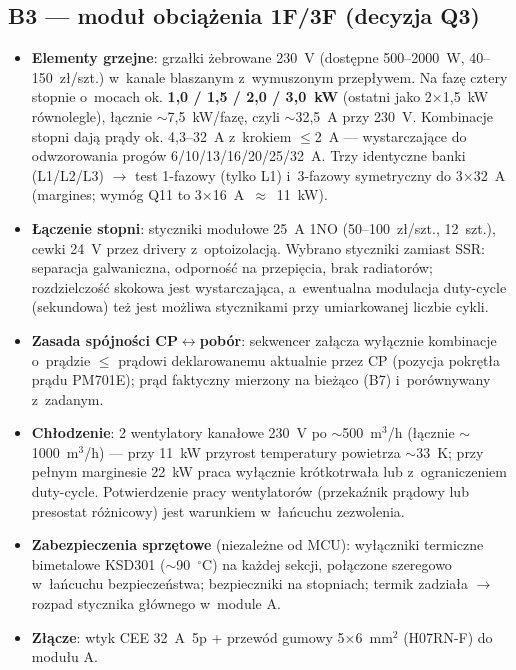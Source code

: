 \documentclass[11pt,a4paper]{article}
\begin{document}
\subsection{B3 --- moduł obciążenia 1F/3F (decyzja Q3)}
\label{sec:b3}

\begin{itemize}
\item \textbf{Elementy grzejne}: grzałki żebrowane 230~V (dostępne 500--2000~W, 40--150~zł/szt.) w~kanale blaszanym z~wymuszonym przepływem. Na fazę cztery stopnie o~mocach ok. \textbf{1,0 / 1,5 / 2,0 / 3,0~kW} (ostatni jako 2$\times$1,5~kW równolegle), łącznie $\sim$7,5~kW/fazę, czyli $\sim$32,5~A przy 230~V. Kombinacje stopni dają prądy ok. 4,3--32~A z~krokiem $\le$2~A --- wystarczające do odwzorowania progów 6/10/13/16/20/25/32~A. Trzy identyczne banki (L1/L2/L3) $\rightarrow$ test 1-fazowy (tylko L1) i~3-fazowy symetryczny do 3$\times$32~A (margines; wymóg Q11 to 3$\times$16~A~$\approx$~11~kW).
\item \textbf{Łączenie stopni}: styczniki modułowe 25~A 1NO (50--100~zł/szt., 12~szt.), cewki 24~V przez drivery z~optoizolacją. Wybrano styczniki zamiast SSR: separacja galwaniczna, odporność na przepięcia, brak radiatorów; rozdzielczość skokowa jest wystarczająca, a~ewentualna modulacja duty-cycle (sekundowa) też jest możliwa stycznikami przy umiarkowanej liczbie cykli.
\item \textbf{Zasada spójności CP$\leftrightarrow$pobór}: sekwencer załącza wyłącznie kombinacje o~prądzie $\le$ prądowi deklarowanemu aktualnie przez CP (pozycja pokrętła prądu PM701E); prąd faktyczny mierzony na bieżąco (B7) i~porównywany z~zadanym.
\item \textbf{Chłodzenie}: 2 wentylatory kanałowe 230~V po $\sim$500~m$^3$/h (łącznie $\sim$1000~m$^3$/h) --- przy 11~kW przyrost temperatury powietrza $\sim$33~K; przy pełnym marginesie 22~kW praca wyłącznie krótkotrwała lub z~ograniczeniem duty-cycle. Potwierdzenie pracy wentylatorów (przekaźnik prądowy lub presostat różnicowy) jest warunkiem w~łańcuchu zezwolenia.
\item \textbf{Zabezpieczenia sprzętowe} (niezależne od MCU): wyłączniki termiczne bimetalowe KSD301 ($\sim$90~$^\circ$C) na każdej sekcji, połączone szeregowo w~łańcuchu bezpieczeństwa; bezpieczniki na stopniach; termik zadziała $\rightarrow$ rozpad stycznika głównego w~module A.
\item \textbf{Złącze}: wtyk CEE 32~A~5p + przewód gumowy 5$\times$6~mm$^2$ (H07RN-F) do modułu A.
\end{itemize}
\end{document}
